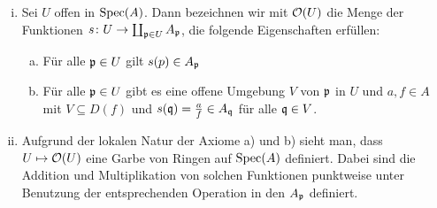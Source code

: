 \begin{kons}
\label{kons:4.11}
	\begin{enumerate}[i)]
		\item Sei $U$ offen in $\operatorname{Spec}(A)$. Dann bezeichnen wir mit $\mathcal{O}(U)$ die Menge der Funktionen $s\colon U \to \coprod_{\mathfrak{p} \in U}A_{\mathfrak{p}}$, die folgende Eigenschaften erfüllen:
		\begin{enumerate}[a)]
			\item Für alle $\mathfrak{p} \in U$ gilt $s(p) \in A_{\mathfrak{p}}$
			\item Für alle $\mathfrak{p} \in U$ gibt es eine offene Umgebung $V$ von $\mathfrak{p}$ in $U$ und $a,f\in A$ mit $V \subseteq D(f)$ und $s(\mathfrak{q}) =  \frac{a}{f} \in A_{\mathfrak{q}}$ für alle $\mathfrak{q} \in V$.
		\end{enumerate}
		\item Aufgrund der lokalen Natur der Axiome a) und b) sieht man, dass $U \mapsto \mathcal{O}(U)$ eine Garbe von Ringen auf $\operatorname{Spec}(A)$ definiert. Dabei sind die Addition und Multiplikation von solchen Funktionen punktweise unter Benutzung der entsprechenden Operation in den $A_{\mathfrak{p}}$ definiert.
	\end{enumerate}
\end{kons}

